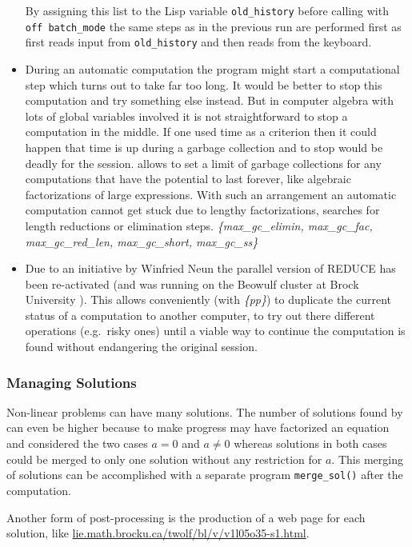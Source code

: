 \begin{itemize}
  By assigning this list to the Lisp variable \texttt{old\_history}
  before calling  with \texttt{off batch\_mode} the
  same steps as in the previous run are performed first as
   first reads input from \texttt{old\_history} and
  then reads from the keyboard.
\item During an automatic computation the program might start a
  computational step which turns out to take far too long.  It would
  be better to stop this computation and try something else instead.
  But in computer algebra with lots of global variables involved it is
  not straightforward to stop a computation in the middle.  If one
  used time as a criterion then it could happen that time is up during
  a garbage collection and to stop would be deadly for the session.
   allows to set a limit of garbage collections for any
  computations that have the potential to last forever, like algebraic
  factorizations of large expressions.  With such an arrangement an
  automatic computation cannot get stuck due to lengthy
  factorizations, searches for length reductions or elimination steps.
  \emph{\{max\_gc\_elimin, max\_gc\_fac, max\_gc\_red\_len,
  max\_gc\_short, max\_gc\_ss\}}
\item Due to an initiative by Winfried Neun the parallel version of
  REDUCE has been re-activated (and was running on the Beowulf cluster
  at Brock University \cite{MelNeun:2002}).  This allows conveniently
  (with \emph{\{pp\}}) to duplicate the current status of a
   computation to another computer, to try out there
  different operations (e.g.\ risky ones) until a viable way to
  continue the computation is found without endangering the original
  session.
  \end{itemize}

\subsubsection{Managing Solutions}

Non-linear problems can have many solutions.  The number of solutions
found by  can even be higher because to make progress
 may have factorized an equation and considered the two
cases $a=0$ and $a \neq 0$ whereas solutions in both cases could be
merged to only one solution without any restriction for $a$.  This
merging of solutions can be accomplished with a separate program
\texttt{merge\_sol()} after the computation.

Another form of post-processing is the production of a web page for
each solution, like
\href{https://lie.math.brocku.ca/twolf/bl/v/v1l05o35-s1.html}{
  lie.math.brocku.ca/twolf/bl/v/v1l05o35-s1.html}.

